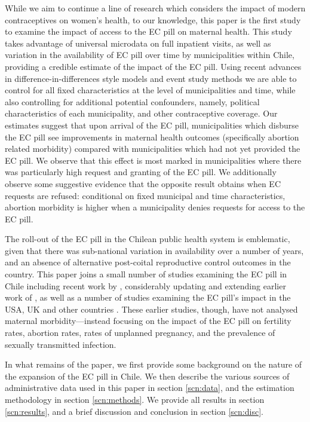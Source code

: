 \documentclass[12pt]{article}
\begin{document}
\begin{spacing}{1.9}
While we aim to continue a line of research which considers the impact of modern contraceptives on women's health, to our knowledge, this paper is the first study to examine the impact of access to the EC pill on maternal health.  This study takes advantage of universal microdata on full inpatient visits, as well as variation in the availability of EC pill over time by municipalities within Chile, providing a credible estimate of the impact of the EC pill.  Using recent advances in  difference-in-differences style models and event study methods  we are able to control for all fixed characteristics at the level of municipalities and time, while also controlling for additional potential confounders, namely, political characteristics of each municipality, %
and other contraceptive coverage.  Our estimates suggest that upon arrival of the EC pill, municipalities which disburse the EC pill see improvements in maternal health outcomes (specifically abortion related morbidity) compared with municipalities which had not yet provided the EC pill.  We observe that this effect is most marked in municipalities where there was particularly high request and granting of the EC pill.  We additionally observe some suggestive evidence that the opposite result obtains when EC requests are refused: conditional on fixed municipal and time characteristics, abortion morbidity is higher when a municipality denies requests for access to the EC pill.

The roll-out of the EC pill in the Chilean public health system is emblematic, given that there was sub-national variation in availability over a number of years, and an absence of alternative post-coital reproductive control outcomes in the country.  This paper joins a small number of studies examining the EC pill in Chile including recent work by \citet{NuevoChiqueroPino2019}, considerably updating and extending earlier work of \citet{BentancorClarke2017}, as well as a number of studies examining the EC pill's impact in the USA, UK and other countries \citep{Grossetal2014,Durrance2013,GirmaPatton2006,GirmaPatton2011,Mulligan2015,Moreauetal2009,Huetal2005}.  These earlier studies, though, have not analysed maternal morbidity---instead focusing on the impact of the EC pill on fertility rates, abortion rates, rates of unplanned pregnancy, and the prevalence of sexually transmitted infection.

In what remains of the paper, we first provide some background on the nature of the expansion of the EC pill in Chile.  We then describe the various sources of administrative data used in this paper in section \ref{scn:data}, and the estimation methodology in section \ref{scn:methods}.  We provide all results in section  \ref{scn:results}, and a brief discussion and conclusion in section \ref{scn:disc}.


\end{spacing}
\end{document}
